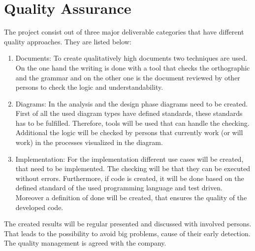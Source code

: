 \section{Quality Assurance}
The project consist out of three major deliverable categories that have different quality approaches. They are listed below:
\begin{enumerate}
	\item Documents: \newline
	To create qualitatively high documents two techniques are used. On the one hand the writing is done with a tool that checks the orthographic and the grammar and on the other one is the document reviewed by other persons to check the logic and understandability. 
	\item Diagrams: \newline
	In the analysis and the design phase diagrams need to be created. First of all the used diagram types have defined standards, these standards has to be fulfilled. Therefore, tools will be used that can handle the checking. Additional the logic will be checked by persons that currently work (or will work) in the processes visualized in the diagram. 
	\item Implementation: \newline
	For the implementation different use cases will be created, that need to be implemented. The checking will be that they can be executed without errors. Furthermore, if code is created, it will be done based on the defined standard of the used programming language and test driven. Moreover a definition of done will be created, that ensures the quality of the developed code.
\end{enumerate}
The created results will be regular presented and discussed with involved persons. That leads to the possibility to avoid big problems, cause of their early detection. The quality management is agreed with the company. 

